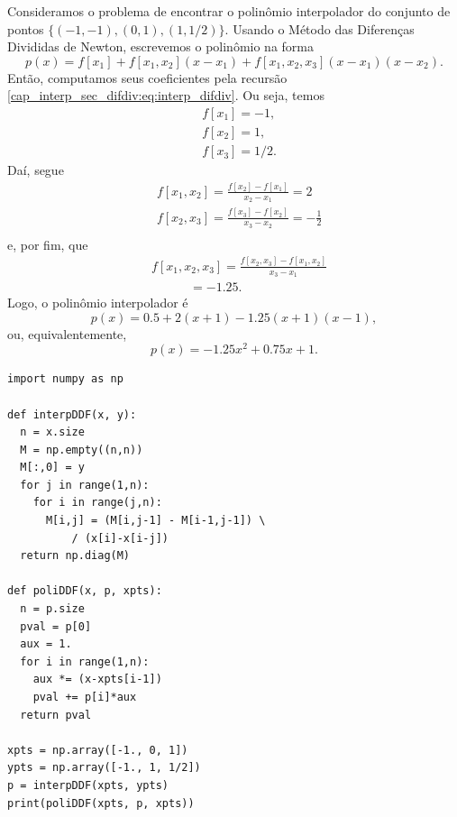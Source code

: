 \begin{ex}
  Consideramos o problema de encontrar o polinômio interpolador do conjunto de pontos $\{(-1, -1), (0, 1), (1, 1/2)\}$. Usando o Método das Diferenças Divididas de Newton, escrevemos o polinômio na forma
  \begin{equation}
    p(x) = f[x_1] + f[x_1,x_2](x-x_1) + f[x_1,x_2,x_3](x-x_1)(x-x_2).
  \end{equation}
  Então, computamos seus coeficientes pela recursão \eqref{cap_interp_sec_difdiv:eq:interp_difdiv}. Ou seja, temos
  \begin{subequations}
    \begin{align}
      &f[x_1] = -1,\\
      &f[x_2] = 1,\\
      &f[x_3] = 1/2.
  \end{align}
  \end{subequations}
  Daí, segue
  \begin{subequations}
    \begin{align}
      &f[x_1,x_2] = \frac{f[x_2]-f[x_1]}{x_2-x_1} = 2\\
      &f[x_2,x_3] = \frac{f[x_3]-f[x_2]}{x_3-x_2} = -\frac{1}{2}\\
    \end{align}
  \end{subequations}
  e, por fim, que
  \begin{subequations}
    \begin{align}
      &f[x_1,x_2,x_3] = \frac{f[x_2,x_3]-f[x_1,x_2]}{x_3-x_1}\\
      &\qquad\quad = -1.25.
    \end{align}
  \end{subequations}
  Logo, o polinômio interpolador é
  \begin{equation}
    p(x) = 0.5 + 2(x+1) - 1.25(x+1)(x-1),
  \end{equation}
  ou, equivalentemente,
  \begin{equation}
    p(x) = -1.25x^2 + 0.75x + 1.
  \end{equation}

\begin{lstlisting}
import numpy as np

def interpDDF(x, y):
  n = x.size
  M = np.empty((n,n))
  M[:,0] = y
  for j in range(1,n):
    for i in range(j,n):
      M[i,j] = (M[i,j-1] - M[i-1,j-1]) \
          / (x[i]-x[i-j])
  return np.diag(M)

def poliDDF(x, p, xpts):
  n = p.size
  pval = p[0]
  aux = 1.
  for i in range(1,n):
    aux *= (x-xpts[i-1])
    pval += p[i]*aux
  return pval

xpts = np.array([-1., 0, 1])
ypts = np.array([-1., 1, 1/2])
p = interpDDF(xpts, ypts)
print(poliDDF(xpts, p, xpts))
\end{lstlisting}

\end{ex}


